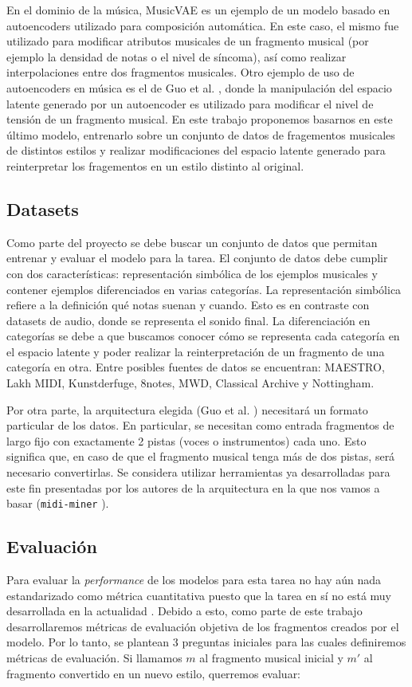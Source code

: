\documentclass[10pt]{article}
\begin{document}
En el dominio de la música, MusicVAE \cite{roberts2019musicvae} es un ejemplo
de un modelo basado en autoencoders utilizado para composición automática. En
este caso, el mismo fue utilizado para modificar atributos musicales de un
fragmento musical (por ejemplo la densidad de notas o el nivel de síncoma), así
como realizar interpolaciones entre dos fragmentos musicales. Otro ejemplo de
uso de autoencoders en música es el de Guo et al. \cite{guo2020variational},
donde la manipulación del espacio latente generado por un autoencoder es
utilizado para modificar el nivel de tensión de un fragmento musical. En este
trabajo proponemos basarnos en este último modelo, entrenarlo sobre un conjunto
de datos de fragementos musicales de distintos estilos y realizar
modificaciones del espacio latente generado para reinterpretar los fragementos
en un estilo distinto al original.

\subsection*{Datasets}
Como parte del proyecto se debe buscar un conjunto de datos que permitan
entrenar y evaluar el modelo para la tarea. El conjunto de datos debe cumplir
con dos características: representación simbólica de los ejemplos musicales y
contener ejemplos diferenciados en varias categorías. La representación
simbólica refiere a la definición qué notas suenan y cuando. Esto es en
contraste con datasets de audio, donde se representa el sonido final.
La diferenciación en categorías se debe a que buscamos conocer cómo se
representa cada categoría en el espacio latente y poder realizar la
reinterpretación de un fragmento de una categoría en otra.
Entre posibles fuentes de datos se encuentran: MAESTRO, Lakh MIDI,
Kunstderfuge, 8notes, MWD, Classical Archive y Nottingham.

Por otra parte, la arquitectura elegida (Guo et al. \cite{guo2020variational})
necesitará un formato particular de los datos. En particular, se necesitan como
entrada fragmentos de largo fijo con exactamente 2 pistas (voces o
instrumentos) cada uno. Esto significa que, en caso de que el fragmento musical
tenga más de dos pistas, será necesario convertirlas. Se considera utilizar  
herramientas ya desarrolladas para este fin presentadas por los autores de la
arquitectura en la que nos vamos a basar (\texttt{midi-miner}
\cite{Guo-reduccion}).

\subsection*{Evaluación}
Para evaluar la \textit{performance} de los modelos para esta tarea no hay aún
nada estandarizado como métrica cuantitativa puesto que la tarea en sí no está
muy desarrollada en la actualidad \cite{briot2020deep}. 
Debido a esto, como parte de este trabajo desarrollaremos métricas de
evaluación objetiva de los fragmentos creados por el modelo.  Por lo tanto, se
plantean 3 preguntas iniciales para las cuales definiremos métricas de
evaluación. Si llamamos $m$ al fragmento musical inicial y $m'$ al fragmento
convertido en un nuevo estilo, querremos evaluar: 
\end{document}
